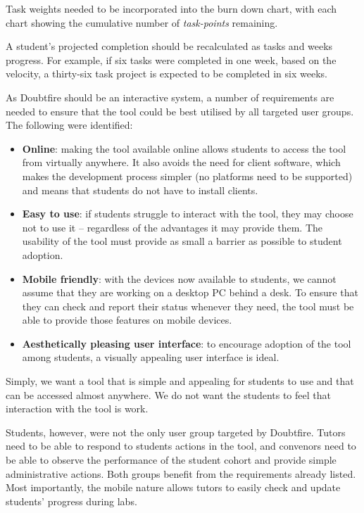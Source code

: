 Task weights needed to be incorporated into the burn down chart, with each chart showing the cumulative number of \emph{task-points} remaining. 

A student's projected completion should be recalculated as tasks and weeks progress. For example, if six tasks were completed in one week, based on the velocity, a thirty-six task project is expected to be completed in six weeks. 


As Doubtfire should be an interactive system, a number of requirements are needed to ensure that the tool could be best utilised by all targeted user groups. The following were identified:
\begin{itemize}[noitemsep,nolistsep]
  \item \textbf{Online}: making the tool available online allows students to access the tool from virtually anywhere. It also avoids the need for client software, which makes the development process simpler (no platforms need to be supported) and means that students do not have to install clients.
  \item \textbf{Easy to use}: if students struggle to interact with the tool, they may choose not to use it -- regardless of the advantages it may provide them. The usability of the tool must provide as small a barrier as possible to student adoption.
  \item \textbf{Mobile friendly}: with the devices now available to students, we cannot assume that they are working on a desktop PC behind a desk. To ensure that they can check and report their status whenever they need, the tool must be able to provide those features on mobile devices.
  \item \textbf{Aesthetically pleasing user interface}: to encourage adoption of the tool among students, a visually appealing user interface is ideal.
\end{itemize}
Simply, we want a tool that is simple and appealing for students to use and that can be accessed almost anywhere. We do not want the students to feel that interaction with the tool is work.

Students, however, were not the only user group targeted by Doubtfire. Tutors need to be able to respond to students actions in the tool, and convenors need to be able to observe the performance of the student cohort and provide simple administrative actions. Both groups benefit from the requirements already listed. Most importantly, the mobile nature allows tutors to easily check and update students' progress during labs.

